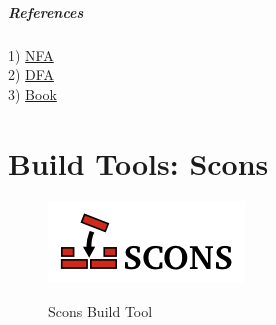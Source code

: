 \documentclass[a4paper,11pt]{report}
\begin{document}
\paragraph{References\\}
1) \href{http://en.wikipedia.org/wiki/Nondeterministic_finite_automaton}{NFA} \\
2) \href{http://en.wikipedia.org/wiki/Deterministic_finite_automaton}{DFA} \\
3) \href{http://dl.e-book-free.com/2013/07/mastering_regular_expressions_third_edition.pdf}{Book} \\

\chapter {Build Tools: Scons}

\begin{figure}[h]
	\centering
		\includegraphics{images/scons-logo-transparent.png}~\\[1cm]
		\caption{Scons Build Tool}
\end{figure}
\end{document}
